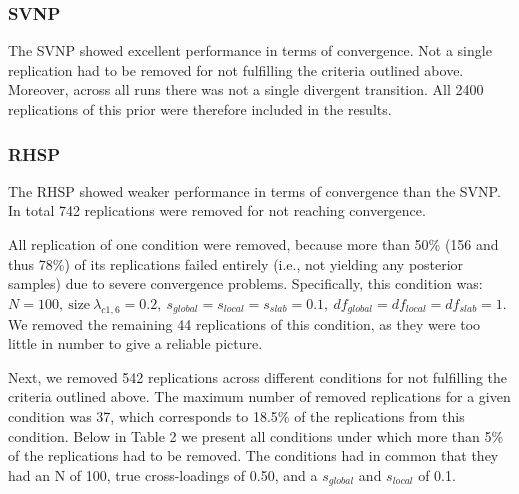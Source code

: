 \documentclass[]{interact}
\theoremstyle{plain}%
\theoremstyle{definition}
\theoremstyle{remark}
\begin{document}
\hypertarget{svnp}{%
\subsubsection{SVNP}\label{svnp}}

The SVNP showed excellent performance in terms of convergence. Not a
single replication had to be removed for not fulfilling the criteria
outlined above. Moreover, across all runs there was not a single
divergent transition. All 2400 replications of this prior were therefore
included in the results.

\hypertarget{rhsp}{%
\subsubsection{RHSP}\label{rhsp}}

The RHSP showed weaker performance in terms of convergence than the
SVNP. In total 742 replications were removed for not reaching
convergence.

All replication of one condition were removed, because more than 50\%
(156 and thus 78\%) of its replications failed entirely (i.e., not
yielding any posterior samples) due to severe convergence problems.
Specifically, this condition was:
\(N = 100, \ \text{size} \ \lambda_{c1,6} = 0.2, \ s_{global} = s_{local} = s_{slab} = 0.1, \ df_{global} = df_{local} = df_{slab} = 1\).
We removed the remaining 44 replications of this condition, as they were
too little in number to give a reliable picture.

Next, we removed 542 replications across different conditions for not
fulfilling the criteria outlined above. The maximum number of removed
replications for a given condition was 37, which corresponds to 18.5\%
of the replications from this condition. Below in Table 2 we present all
conditions under which more than 5\% of the replications had to be
removed. The conditions had in common that they had an N of 100, true
cross-loadings of 0.50, and a \(s_{global}\) and \(s_{local}\) of 0.1.
\end{document}
